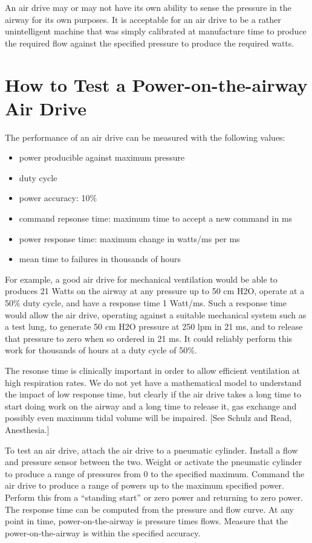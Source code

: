 \documentclass{article}
\begin{document}
An air drive may or may not have its own ability to sense the pressure in the airway
for its own purposes. It is acceptable for an air drive to be a rather unintelligent
machine that was simply calibrated at manufacture time to produce the required
flow against the specified pressure to produce the required watts.

\section{How to Test a  Power-on-the-airway Air Drive}

The performance of an air drive can be measured with the following values:
\begin{itemize}
\item{power producible against maximum pressure}
\item{duty cycle}
\item{power accuracy: 10\%}
\item{command repsonse time: maximum time to accept a new command in ms}
\item{power response time: maximum change in watts/ms per ms}
\item{mean time to failures in thousands of hours}
\end{itemize}


For example, a good air drive for mechanical ventilation would be
able to produces 21 Watts on the airway at any pressure up to 50 cm H2O, operate at a
50\% duty cycle, and have a response time 1 Watt/ms. Such a response time
would allow the air drive, operating against a suitable mechanical system such
as a test lung, to generate 50 cm H2O pressure at 250 lpm in 21 ms, and
to release that pressure to zero when so ordered in 21 ms.
It could reliably perform this work for thousands of hours at a duty cycle of 50\%.

The resonse time is clinically important in order to allow efficient ventilation
at high respiration rates.
We do not yet have a mathematical model to understand the impact of low response time,
but clearly if the air drive takes a long time to start doing work on the airway
and a long time to release it, gas exchange and possibly even maximum tidal volume
will be impaired. [See Schulz and Read, Anesthesia.]

To test an air drive, attach the air drive to a pneumatic cylinder. Install a flow
and pressure sensor between the two. Weight or activate the pneumatic cylinder
to produce a range of pressures from 0 to the specified maximum. Command the air drive
to produce a range of powers up to the maximum specified power. Perform this
from a ``standing start'' or zero power and returning to zero power. The response time
can be computed from the pressure and flow curve. At any point in time, power-on-the-airway
is pressure times flows. Measure that the power-on-the-airway is within the specified
accuracy.
\end{document}

